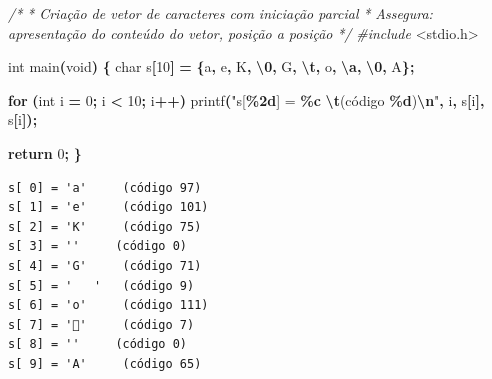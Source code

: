 \documentclass[
  11pt,
  a4paper,
]{scrbook}
\newenvironment{Shaded}{\begin{snugshade}}{\end{snugshade}}
\newcommand{\CharTok}[1]{\textcolor[rgb]{0.31,0.60,0.02}{#1}}
\newcommand{\CommentTok}[1]{\textcolor[rgb]{0.56,0.35,0.01}{\textit{#1}}}
\newcommand{\ControlFlowTok}[1]{\textcolor[rgb]{0.13,0.29,0.53}{\textbf{#1}}}
\newcommand{\DataTypeTok}[1]{\textcolor[rgb]{0.13,0.29,0.53}{#1}}
\newcommand{\DecValTok}[1]{\textcolor[rgb]{0.00,0.00,0.81}{#1}}
\newcommand{\ImportTok}[1]{#1}
\newcommand{\NormalTok}[1]{#1}
\newcommand{\OperatorTok}[1]{\textcolor[rgb]{0.81,0.36,0.00}{\textbf{#1}}}
\newcommand{\PreprocessorTok}[1]{\textcolor[rgb]{0.56,0.35,0.01}{\textit{#1}}}
\newcommand{\SpecialCharTok}[1]{\textcolor[rgb]{0.81,0.36,0.00}{\textbf{#1}}}
\newcommand{\StringTok}[1]{\textcolor[rgb]{0.31,0.60,0.02}{#1}}
\begin{document}
\begin{Shaded}
\begin{Highlighting}[]
\CommentTok{/*}
\CommentTok{ * Criação de vetor de caracteres com iniciação parcial}
\CommentTok{ * Assegura: apresentação do conteúdo do vetor, posição a posição}
\CommentTok{ */}
\PreprocessorTok{\#include }\ImportTok{\textless{}stdio.h\textgreater{}}

\DataTypeTok{int}\NormalTok{ main}\OperatorTok{(}\DataTypeTok{void}\OperatorTok{)} \OperatorTok{\{}
    \DataTypeTok{char}\NormalTok{ s}\OperatorTok{[}\DecValTok{10}\OperatorTok{]} \OperatorTok{=} \OperatorTok{\{}\CharTok{\textquotesingle{}a\textquotesingle{}}\OperatorTok{,} \CharTok{\textquotesingle{}e\textquotesingle{}}\OperatorTok{,} \CharTok{\textquotesingle{}K\textquotesingle{}}\OperatorTok{,} \CharTok{\textquotesingle{}}\SpecialCharTok{\textbackslash{}0}\CharTok{\textquotesingle{}}\OperatorTok{,} \CharTok{\textquotesingle{}G\textquotesingle{}}\OperatorTok{,} \CharTok{\textquotesingle{}}\SpecialCharTok{\textbackslash{}t}\CharTok{\textquotesingle{}}\OperatorTok{,} \CharTok{\textquotesingle{}o\textquotesingle{}}\OperatorTok{,} \CharTok{\textquotesingle{}}\SpecialCharTok{\textbackslash{}a}\CharTok{\textquotesingle{}}\OperatorTok{,} \CharTok{\textquotesingle{}}\SpecialCharTok{\textbackslash{}0}\CharTok{\textquotesingle{}}\OperatorTok{,} \CharTok{\textquotesingle{}A\textquotesingle{}}\OperatorTok{\};}

    \ControlFlowTok{for} \OperatorTok{(}\DataTypeTok{int}\NormalTok{ i }\OperatorTok{=} \DecValTok{0}\OperatorTok{;}\NormalTok{ i }\OperatorTok{\textless{}} \DecValTok{10}\OperatorTok{;}\NormalTok{ i}\OperatorTok{++)}
\NormalTok{        printf}\OperatorTok{(}\StringTok{"s[}\SpecialCharTok{\%2d}\StringTok{] = \textquotesingle{}}\SpecialCharTok{\%c}\StringTok{\textquotesingle{} }\SpecialCharTok{\textbackslash{}t}\StringTok{(código }\SpecialCharTok{\%d}\StringTok{)}\SpecialCharTok{\textbackslash{}n}\StringTok{"}\OperatorTok{,}\NormalTok{ i}\OperatorTok{,}\NormalTok{ s}\OperatorTok{[}\NormalTok{i}\OperatorTok{],}\NormalTok{ s}\OperatorTok{[}\NormalTok{i}\OperatorTok{]);}

    \ControlFlowTok{return} \DecValTok{0}\OperatorTok{;}
\OperatorTok{\}}
\end{Highlighting}
\end{Shaded}

\begin{verbatim}
s[ 0] = 'a' 	(código 97)
s[ 1] = 'e' 	(código 101)
s[ 2] = 'K' 	(código 75)
s[ 3] = ' ' 	(código 0)
s[ 4] = 'G' 	(código 71)
s[ 5] = '	' 	(código 9)
s[ 6] = 'o' 	(código 111)
s[ 7] = '' 	(código 7)
s[ 8] = ' ' 	(código 0)
s[ 9] = 'A' 	(código 65)
\end{verbatim}
\end{document}
